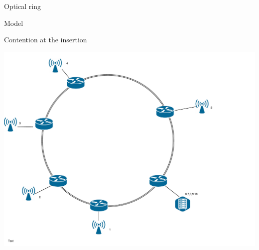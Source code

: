 \documentclass[10 pt]{beamer}
\begin{document}
\begin{frame}{Optical ring}
\begin{block}{Model}
\begin{center}
Contention at the insertion
\end{center}
\end{block}

\begin{center}
\includegraphics[scale=0.13]{anneau-simple.pdf}
\end{center}


\end{frame}
\end{document}
